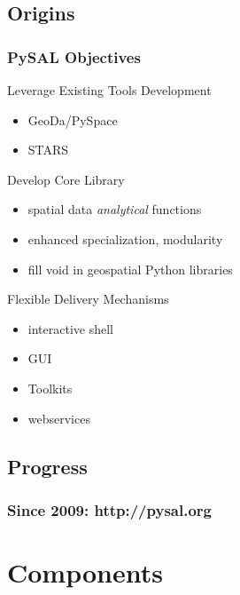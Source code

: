 \documentclass{beamer}
\begin{document}
\subsection{Origins}
\begin{frame}\frametitle{PySAL Objectives}
  \begin{block}{Leverage Existing Tools Development}
    \begin{itemize}
      \item GeoDa/PySpace
      \item STARS
    \end{itemize}
  \end{block}
  \begin{block}{Develop Core Library}
    \begin{itemize}
      \item spatial data \emph{analytical} functions
      \item enhanced specialization, modularity
      \item fill void in geospatial Python libraries
    \end{itemize}
  \end{block}
  \begin{block}{Flexible Delivery Mechanisms}
    \begin{itemize}
      \item interactive shell
      \item GUI
      \item Toolkits
      \item webservices
    \end{itemize}
  \end{block}
\end{frame}

\subsection{Progress}

\begin{frame}\frametitle{Since 2009: http://pysal.org}
    \begin{center}
         \begin{figure}
          \end{figure}      
    \end{center}
\end{frame}

\section{Components}
\end{document}
